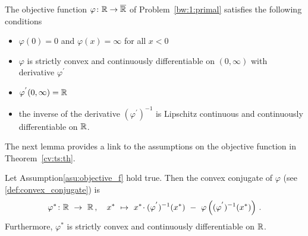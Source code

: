 \begin{assumption}
  \label{asu:objective_f}
  The objective function $\varphi\colon \mathbb{R}\to\overline{\mathbb{R}}$ of Problem~\ref{bw:1:primal} 
  satisfies the following conditions
  \begin{itemize}
    \item
      $\varphi(0)=0$ and $\varphi(x)=\infty$ for all $x<0$
    \item
      $\varphi$ is strictly convex and continuously differentiable on $(0,\infty)$ with derivative $\varphi^{'}$
    \item
      $\varphi^{'}(0,\infty)=\mathbb{R}$
    \item
      the inverse of the derivative $(\varphi^{'})^{-1}$ is Lipschitz continuous and continuously differentiable on $\mathbb{R}$.
  \end{itemize}
\end{assumption}
The next lemma provides a link to the assumptions on the objective function in Theorem~\ref{cv:ts:th}.
\newpage
\begin{lemma}
  \label{1065}
  Let Assumption\ref{asu:objective_f} hold true. Then the convex conjugate of $\varphi$ (see \eqref{def:convex_conjugate}) is
  \begin{gather*}
    \varphi^*
    \colon
    \R
    \ 
    \to
    \ 
    \R
    \,,
    \quad
    x^*
    \ 
    \mapsto
    \ 
    x^*
    \!
    \cdot
    (
    \varphi^{'}
    )^{-1}
    (x^*)
    \ 
    -
    \ 
    \varphi
    \left( 
      (
    \varphi^{'}
    )^{-1}
    (x^*)
    \right)
    \,.
  \end{gather*}
  Furthermore, $\varphi^*$ is strictly convex and continuously differentiable on $\mathbb{R}$.
\end{lemma}
